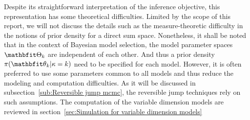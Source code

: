Despite its straightforward interpretation of the inference objective, this
representation has some theoretical difficulties. Limited by the scope of this
report, we will not discuss the details such as the measure-theoretic
difficulty in the notions of prior density for a direct sum space.
Nonetheless, it shall be noted that in the context of Bayesian model
selection, the model parameter spaces $\bTh_k$ are independent of each other.
And thus a prior density $\pi(\bth_k|\kappa =k)$ need to be specified for each
model. However, it is often preferred to use some parameters common to all
models and thus reduce the modeling and computation difficulties. As it will
be discussed in subsection~\ref{sub:Reversible jump mcmc}, the reversible jump
\mcmc techniques rely on such assumptions. The computation of the variable
dimension models are reviewed in section~\ref{sec:Simulation for variable
  dimension models}
